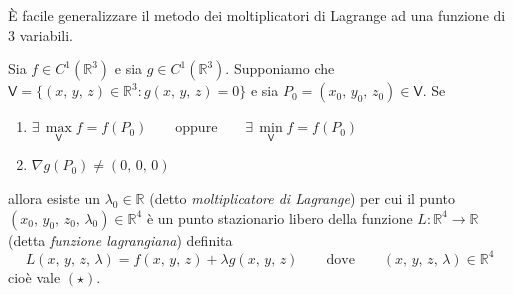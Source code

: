 \`E facile generalizzare il metodo dei moltiplicatori di Lagrange ad una funzione di $3$ variabili.

\begin{thm}
Sia $f \in C^1(\mathbb{R}^3)$ e sia $g \in C^1(\mathbb{R}^3)$. Supponiamo che $\mathsf{V} = \lbrace (x,\,y,\,z) \in \mathbb{R}^3 : g(x,\,y,\,z) = 0 \rbrace$ e sia $P_0 = (x_0,\,y_0,\,z_0) \in \mathsf{V}$. Se
\begin{enumerate}[labelindent=\parindent,leftmargin=*,label=\textnormal{(\roman*)},start=1]
\item $\exists \, \underset{\mathsf{V}}{\max} f = f(P_0) \qquad \text{oppure} \qquad \exists \, \underset{\mathsf{V}}{\min} f = f(P_0)$
\item $\nabla g(P_0) \neq (0,\,0,\,0)$
\end{enumerate}
allora esiste un $\lambda_0 \in \mathbb{R}$ (detto \emph{moltiplicatore di Lagrange}) per cui il punto $(x_0,\,y_0,\,z_0,\,\lambda_0) \in \mathbb{R}^4$ è un punto stazionario libero della funzione $L : \mathbb{R}^4 \longrightarrow \mathbb{R}$ (detta \emph{funzione lagrangiana}) definita
$$
L(x,\,y,\,z,\,\lambda) = f(x,\,y,\,z) + \lambda g(x,\,y,\,z) \qquad \text{dove} \qquad (x,\,y,\,z,\,\lambda) \in \mathbb{R}^4
$$
cioè vale $\mathrm{(\star)}$.
\begin{center}
\def\svgwidth{10cm}

\end{center}
\end{thm}